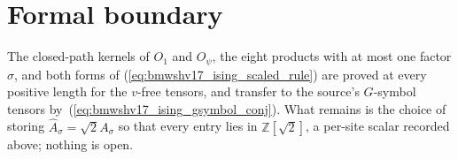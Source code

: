 \documentclass{article}
\begin{document}
\section{Formal boundary}

The closed-path kernels of $O_1$ and $O_\psi$, the eight products with at
most one factor $\sigma$, and both forms of
(\ref{eq:bmwshv17_ising_scaled_rule}) are proved at every positive length
for the $v$-free tensors, and transfer to the source's $G$-symbol tensors
by~(\ref{eq:bmwshv17_ising_gsymbol_conj}). What remains is the choice of
storing $\widehat A_\sigma=\sqrt2A_\sigma$ so that every entry lies in
$\mathbb Z[\sqrt2]$, a per-site scalar recorded above; nothing is open.



\end{document}

